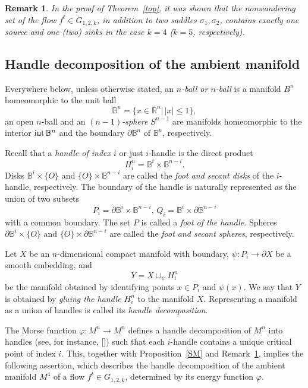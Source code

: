 \documentclass[%
 aip,
 amsmath,amssymb,
preprint,%
]{revtex4-1}
\newtheorem{remark}{Remark}
\begin{document}
\begin{remark}\label{nw} In the proof of Theorem~\ref{top}, it was shown that the nonwandering set of the flow $f^t\in G_{1,2,k}$, in addition to two saddles $\sigma_1, \sigma_2$, contains exactly one source and one (two) sinks in the case $k=4$ ($k=5$, respectively).

\end{remark}

\subsection{Handle decomposition of the ambient manifold}\label{dec}

Everywhere below, unless otherwise stated, an {\it $n$-ball or $n$-ball} is a manifold $B^n$ homeomorphic to the unit ball $$\mathbb B^n=\{x\in \mathbb R^n|\, |x|\leq 1\},$$ an open $n$-ball and an {\it $(n-1)$-sphere} $S^{n-1}$ are manifolds homeomorphic to the interior ${\rm int}\, \mathbb B^n$ and the boundary $\partial \mathbb B^n$ of  $\mathbb B^n$, respectively.

Recall that a {\it handle of index $i$} or just  {$i$-handle} is the direct product $$H^n_i=\mathbb {B}^i\times \mathbb {B}^{n-i}.$$ Disks $\mathbb B^i\times \{O\}$ and $\{O\}\times \mathbb B^{n-i}$ are called the {\it foot and secant  disks} of the $i$-handle, respectively. The boundary of the handle is naturally represented as the union of two subsets $$P_i=\partial \mathbb B^i\times \mathbb B^{n-i}, \, Q_i=\mathbb B^i\times \partial\mathbb B^{n-i}$$ with a common boundary. The set $P$ is called a {\it foot of the handle}. Spheres $\partial{\mathbb B}^i\times \{O\}$ and $\{O\}\times \partial{\mathbb B}^{n-i}$ are called the {\it foot  and secant spheres}, respectively.

Let $X$ be an $n$-dimensional compact manifold with boundary, $\psi: P_i \to \partial X$ be a smooth embedding, and $$Y=X\cup_\psi H^n_i$$ be the manifold obtained by identifying points $x\in P_i$ and $\psi(x)$. We say that $Y$ is obtained by {\it gluing the handle $H^n_i$} to the manifold $X$.
Representing a manifold as a union of handles is called its {\it handle decomposition}.

The Morse function $\varphi: M^n\to M^n$ defines a handle decomposition  of $M^n$ into handles (see, for instance, []) such that each $i$-handle contains a unique critical point of index $i$. This, together with Proposition~\ref{SM} and Remark~\ref{nw}, implies the following assertion, which describes the handle decomposition of the ambient  manifold $M^4$ of a flow $f^t\in G_{1,2,k}$,  determined by its energy function $\varphi$.
\end{document}
